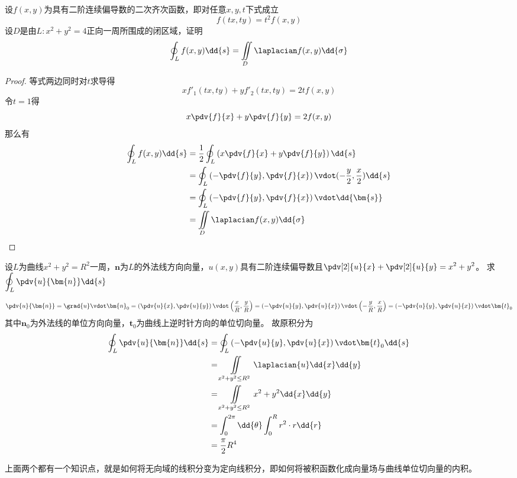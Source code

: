 \begin{example}
    设$f(x,y)$为具有二阶连续偏导数的二次齐次函数，即对任意$x,y,t$下式成立
    \[ f(tx,ty) = t^2f(x,y) \]
    设$D$是由$L:x^2+y^2=4$正向一周所围成的闭区域，证明
    \[ \oint_L f(x,y)\dd{s} = \iint\limits_D \laplacian f(x,y) \dd{\sigma} \]
\end{example}
\begin{proof}
    等式两边同时对$t$求导得
    \[ xf'_1(tx,ty) + yf'_2(tx,ty) = 2tf(x,y) \]
    令$t=1$得
    \[ x\pdv{f}{x} + y\pdv{f}{y} = 2f(x,y) \]
    那么有
    \begin{align*}
        \oint_L f(x,y)\dd{s}
         & = \frac{1}{2} \oint_L \left(x\pdv{f}{x} + y\pdv{f}{y}\right)\dd{s}                   \\
         & =  \oint_L \left(-\pdv{f}{y},\pdv{f}{x}\right) \vdot(-\frac{y}{2},\frac{x}{2})\dd{s} \\
         & =  \oint_L \left(-\pdv{f}{y},\pdv{f}{x}\right) \vdot\dd{\bm{s}}                      \\
         & = \iint\limits_D \laplacian f(x,y) \dd{\sigma}
    \end{align*}
\end{proof}

\begin{example}
    设$L$为曲线$x^2+y^2=R^2$一周，$\bm{n}$为$L$的外法线方向向量，$u(x,y)$具有二阶连续偏导数且$\displaystyle \pdv[2]{u}{x} + \pdv[2]{u}{y}=x^2+y^2$。
    求$\displaystyle\oint_L \pdv{u}{\bm{n}}\dd{s}$
\end{example}
\begin{solution}
    \[
        \pdv{u}{\bm{n}}
        = \grad{u}\vdot\bm{n}_0
        = \left(\pdv{u}{x},\pdv{u}{y}\right)\vdot\left(\frac{x}{R},\frac{y}{R}\right)
        = \left(-\pdv{u}{y},\pdv{u}{x}\right)\vdot\left(-\frac{y}{R},\frac{x}{R}\right)
        = \left(-\pdv{u}{y},\pdv{u}{x}\right)\vdot\bm{t}_0
    \]
    其中$\bm{n}_0$为外法线的单位方向向量，$\bm{t}_0$为曲线上逆时针方向的单位切向量。
    故原积分为
    \begin{align*}
        \oint_L \pdv{u}{\bm{n}}\dd{s}
         & = \oint_L \left(-\pdv{u}{y},\pdv{u}{x}\right)\vdot\bm{t}_0\dd{s} \\
         & = \iint\limits_{x^2+y^2\leq R^2} \laplacian{u} \dd{x}\dd{y}      \\
         & = \iint\limits_{x^2+y^2\leq R^2} x^2+y^2 \dd{x}\dd{y}            \\
         & = \int_0^{2\pi} \dd{\theta} \int_0^R r^2\cdot r \dd{r}           \\
         & =\frac{\pi}{2}R^4
    \end{align*}
\end{solution}
上面两个都有一个知识点，就是如何将无向域的线积分变为定向线积分，即如何将被积函数化成向量场与曲线单位切向量的内积。


